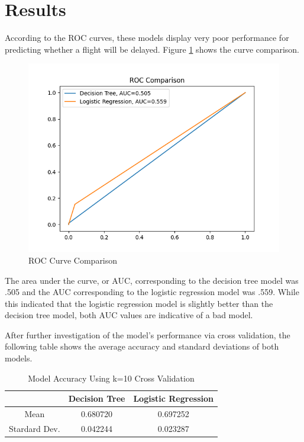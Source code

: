 \documentclass[journal]{IEEEtran}
\begin{document}
\vspace{50px}

\section{Results}
\label{sec:results}

According to the ROC curves, these models display very poor performance for predicting whether a flight will be delayed. Figure \ref{fig:roc} shows the curve comparison. 

\begin{figure}[h!]
\includegraphics[scale=0.5]{rocCurves.png}
\centering
\caption{ROC Curve Comparison}
\label{fig:roc}
\end{figure}

The area under the curve, or AUC, corresponding to the decision tree model was .505 and the AUC corresponding to the logistic regression model was .559. While this indicated that the logistic regression model is slightly better than the decision tree model, both AUC values are indicative of a bad model. 

After further investigation of the model's performance via cross validation, the following table shows the average accuracy and standard deviations of both models. 

\begin{table}[h!]
\centering
\begin{tabular}{ c | c c }
& Decision Tree & Logistic Regression\\ 
\hline
Mean &	0.680720 &	0.697252 \\
Stardard Dev. &	0.042244 &	0.023287 \\
\end{tabular}
\caption{Model Accuracy Using k=10 Cross Validation}
\label{table:crossVal}
\end{table}
\end{document}
